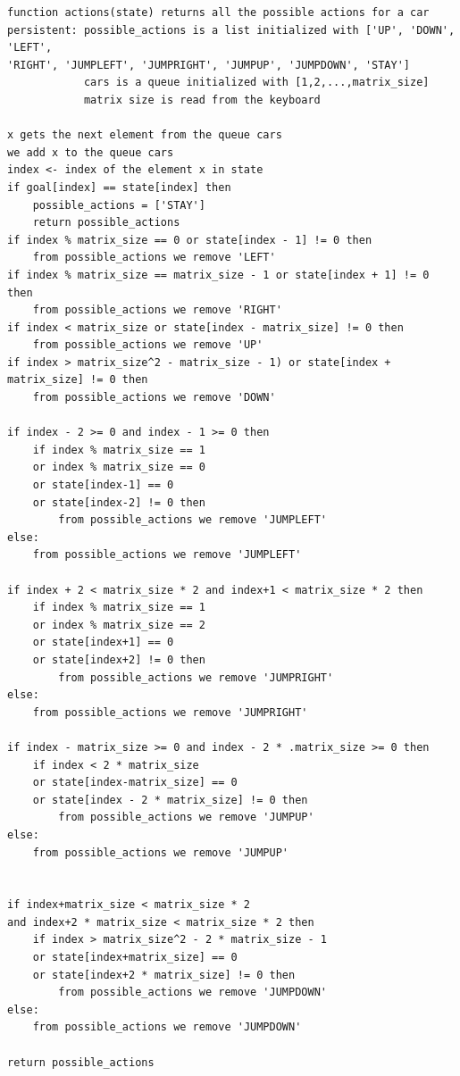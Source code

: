 \documentclass[14pt]{article}
\begin{document}
\begin{verbatim}
function actions(state) returns all the possible actions for a car
persistent: possible_actions is a list initialized with ['UP', 'DOWN', 'LEFT', 
'RIGHT', 'JUMPLEFT', 'JUMPRIGHT', 'JUMPUP', 'JUMPDOWN', 'STAY']
            cars is a queue initialized with [1,2,...,matrix_size]
            matrix size is read from the keyboard

x gets the next element from the queue cars
we add x to the queue cars
index <- index of the element x in state
if goal[index] == state[index] then
    possible_actions = ['STAY']
    return possible_actions
if index % matrix_size == 0 or state[index - 1] != 0 then
    from possible_actions we remove 'LEFT'
if index % matrix_size == matrix_size - 1 or state[index + 1] != 0 then
    from possible_actions we remove 'RIGHT'
if index < matrix_size or state[index - matrix_size] != 0 then
    from possible_actions we remove 'UP'
if index > matrix_size^2 - matrix_size - 1) or state[index + matrix_size] != 0 then 
    from possible_actions we remove 'DOWN'
    
if index - 2 >= 0 and index - 1 >= 0 then
    if index % matrix_size == 1 
    or index % matrix_size == 0  
    or state[index-1] == 0 
    or state[index-2] != 0 then
        from possible_actions we remove 'JUMPLEFT'
else:
    from possible_actions we remove 'JUMPLEFT'

if index + 2 < matrix_size * 2 and index+1 < matrix_size * 2 then
    if index % matrix_size == 1 
    or index % matrix_size == 2 
    or state[index+1] == 0 
    or state[index+2] != 0 then
        from possible_actions we remove 'JUMPRIGHT'
else:
    from possible_actions we remove 'JUMPRIGHT'

if index - matrix_size >= 0 and index - 2 * .matrix_size >= 0 then
    if index < 2 * matrix_size 
    or state[index-matrix_size] == 0 
    or state[index - 2 * matrix_size] != 0 then
        from possible_actions we remove 'JUMPUP'
else:
    from possible_actions we remove 'JUMPUP'


if index+matrix_size < matrix_size * 2 
and index+2 * matrix_size < matrix_size * 2 then
    if index > matrix_size^2 - 2 * matrix_size - 1 
    or state[index+matrix_size] == 0 
    or state[index+2 * matrix_size] != 0 then
        from possible_actions we remove 'JUMPDOWN'
else:
    from possible_actions we remove 'JUMPDOWN'
    
return possible_actions

\end{verbatim}
\end{document}
